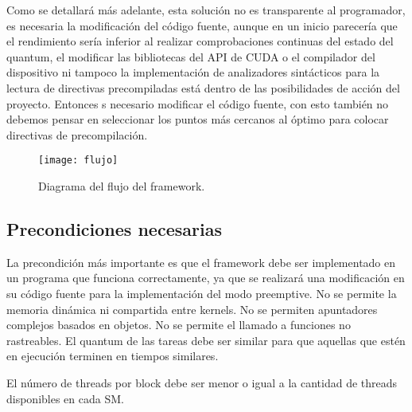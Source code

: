 \begin{itemize}
  

Como se detallará más adelante, esta solución no es transparente al programador, es necesaria la modificación del código fuente, aunque en un inicio parecería que el rendimiento sería inferior al realizar comprobaciones continuas del estado del quantum, el modificar las bibliotecas del API de CUDA o el compilador del dispositivo ni tampoco la implementación de analizadores sintácticos para la lectura de directivas precompiladas está dentro de las posibilidades de acción del proyecto. 
Entonces s necesario modificar el código fuente, con esto también no debemos pensar en seleccionar los puntos más cercanos al óptimo para colocar directivas de precompilación.
\newline 


\end{itemize}   

  \begin{figure}[ht]
      \centering
        \texttt{[image: flujo]}
        \caption{Diagrama del flujo del framework.}
        \label{fig:flujo}
    \end{figure}

\subsection{Precondiciones necesarias} \label{secc:precondiciones}
La precondición más importante es que el framework debe ser implementado en un programa que funciona correctamente, ya que se realizará una modificación en su código fuente para la implementación del modo preemptive.
No se permite la memoria dinámica ni compartida entre kernels.
No se permiten apuntadores complejos basados en objetos.
No se permite el llamado a funciones no rastreables.
El quantum de las tareas debe ser similar para que aquellas que estén en ejecución terminen en tiempos similares.

El número de threads por block debe ser menor o igual a la cantidad de threads disponibles en cada SM.

